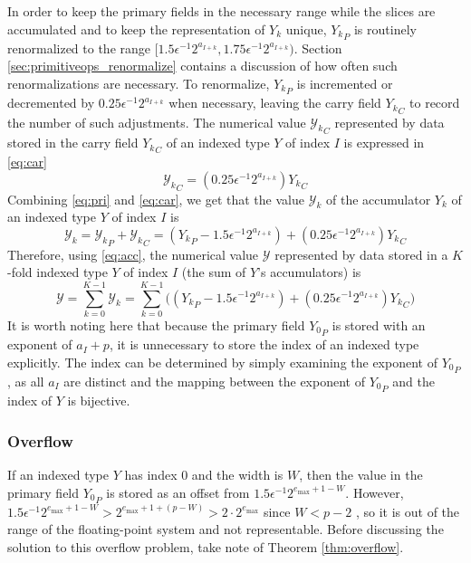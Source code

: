 \documentclass[12pt]{article}
\providecommand{\max}{\ensuremath{\text{max}}}
\theoremstyle{definition}
\numberwithin{equation}{section}
\numberwithin{figure}{section}
\begin{document}
      In order to keep the primary fields in the necessary range while the slices are accumulated and to keep the representation of $Y_k$ unique, ${Y_k}_P$ is routinely renormalized to the range $[1.5 \epsilon^{-1} 2^{a_{I + k}}, 1.75 \epsilon^{-1} 2^{a_{I + k}})$. Section \ref{sec:primitiveops_renormalize} contains a discussion of how often such renormalizations are necessary.
      To renormalize, ${Y_k}_P$ is incremented or decremented by $0.25 \epsilon^{-1} 2^{a_{I + k}}$ when necessary, leaving the carry field ${Y_k}_C$ to record the number of such adjustments.
      The numerical value ${\mathcal{Y}_k}_C$ represented by data stored in the carry field ${Y_k}_C$ of an indexed type $Y$ of index $I$ is expressed in \eqref{eq:car}
      \begin{equation}
        {\mathcal{Y}_k}_C = (0.25\epsilon^{-1}2^{a_{I + k}}){Y_k}_C
        \label{eq:car}
      \end{equation}
      Combining \eqref{eq:pri} and \eqref{eq:car}, we get that the value $\mathcal{Y}_k$ of the accumulator $Y_k$ of an indexed type $Y$ of index $I$ is
      \begin{equation}
        \mathcal{Y}_k = {\mathcal{Y}_k}_P + {\mathcal{Y}_k}_C = ({Y_k}_P - 1.5 \epsilon^{-1}2^{a_{I + k}}) + (0.25\epsilon^{-1}2^{a_{I + k}}){Y_k}_C
        \label{eq:acc}
      \end{equation}
      Therefore, using  \eqref{eq:acc}, the numerical value $\mathcal{Y}$ represented by data stored in a $K$-fold indexed type $Y$ of index $I$ (the sum of $Y$'s accumulators) is
      \begin{equation}
        \mathcal{Y} = \sum\limits_{k = 0}^{K - 1} \mathcal{Y}_k = \sum\limits_{k = 0}^{K - 1} \bigl(({Y_k}_P - 1.5 \epsilon^{-1}2^{a_{I + k}}) + (0.25\epsilon^{-1}2^{a_{I + k}}){Y_k}_C\bigr)
        \label{eq:indexedvalue}
      \end{equation}
      It is worth noting here that because the primary field ${Y_0}_P$ is stored with an exponent of $a_I + p$, it is unnecessary to store the index of an indexed type explicitly. The index can be determined by simply examining the exponent of ${Y_0}_P$, as all $a_I$ are distinct and the mapping between the exponent of ${Y_0}_P$ and the index of $Y$ is bijective.

    \subsubsection{Overflow}
      \label{sec:indexed_overflow}
      If an indexed type $Y$ has index 0 and the width is $W$, then the value in the primary field ${Y_0}_P$ is stored as an offset from $1.5\epsilon^{-1}2^{e_{\max} + 1 - W}$. However, $1.5\epsilon^{-1}2^{e_{\max} + 1 - W} > 2^{e_{\max} + 1 + (p - W)} > 2 \cdot 2^{e_{\max}}$ since $W < p - 2$ \cite{repsum}, so it is out of the range of the floating-point system and not representable. Before discussing the solution to this overflow problem, take note of Theorem \ref{thm:overflow}.
\end{document}
